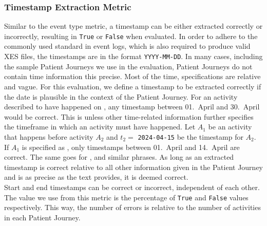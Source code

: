 \subsubsection{Timestamp Extraction Metric}\label{sec:time_metrics}
Similar to the event type metric, a timestamp can be either extracted correctly or incorrectly, resulting in \verb|True| or \verb|False| when evaluated. In order to adhere to the commonly used standard in event logs, which is also required to produce valid XES files, the timestamps are in the format \verb|YYYY-MM-DD|. In many cases, including the sample Patient Journeys we use in the evaluation, Patient Journeys do not contain time information this precise. Most of the time, specifications are relative and vague. For this evaluation, we define a timestamp to be extracted correctly if the date is plausible in the context of the Patient Journey. For an activity described to have happened on , any timestamp between 01.~April and 30.~April would be correct. This is unless other time-related information further specifies the timeframe in which an activity must have happened. Let $A_1$ be an activity that happens before activity $A_2$ and $t_2=$ \verb|2024-04-15| be the timestamp for $A_2$. If $A_1$ is specified as , only timestamps between 01.~April and 14.~April are correct. The same goes for ,  and similar phrases. As long as an extracted timestamp is correct relative to all other information given in the Patient Journey and is as precise as the text provides, it is deemed correct.\\
Start and end timestamps can be correct or incorrect, independent of each other. The value we use from this metric is the percentage of \verb|True| and \verb|False| values respectively. This way, the number of errors is relative to the number of activities in each Patient Journey.

